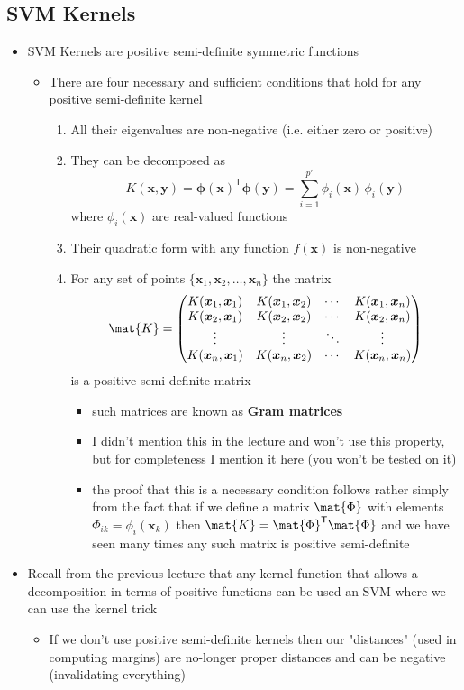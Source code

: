 \documentclass[11pt]{article}
\newcommand{\tr}{\textsf{T}}
\begin{document}
\subsection{SVM Kernels}
\label{sec:org3a7ead6}
\begin{itemize}
\item SVM Kernels are positive semi-definite symmetric functions
\begin{itemize}
\item There are four necessary and sufficient conditions that hold
for any positive semi-definite kernel
\begin{enumerate}
\item All their eigenvalues are non-negative (i.e. either zero or positive)
\item They can be decomposed as
$$  K(\bm{x},\bm{y}) = \bm{\phi}(\bm{x})^\tr\bm{\phi}(\bm{y}) =
          \sum_{i=1}^{p'} \phi_i(\bm{x})\,\phi_i(\bm{y})$$
where \(\phi_i(\bm{x})\) are real-valued functions
\item Their quadratic form with any function \(f(\bm{x})\) is non-negative
\item For any set of points \(\{\bm{x}_1, \bm{x}_2, \ldots,
          \bm{x}_n\}\) the matrix
$$ \mat{K} = \begin{pmatrix} K(\bm{x}_1, \bm{x}_1) &
          K(\bm{x}_1, \bm{x}_2) &\cdots &  K(\bm{x}_1, \bm{x}_n) \\
          K(\bm{x}_2, \bm{x}_1) &
          K(\bm{x}_2, \bm{x}_2) &\cdots &  K(\bm{x}_2, \bm{x}_n) \\
	  \vdots & \vdots & \ddots & \vdots \\
          K(\bm{x}_n, \bm{x}_1) &
          K(\bm{x}_n, \bm{x}_2) &\cdots &  K(\bm{x}_n, \bm{x}_n) 
	  \end{pmatrix} $$
is a positive semi-definite matrix
\begin{itemize}
\item such matrices are known as \textbf{Gram matrices}
\item I didn't mention this in the lecture and won't use this
property, but for completeness I mention it here (you
won't be tested on it)
\item the proof that this is a necessary condition follows
rather simply from the fact that if we define a matrix
\(\mat{\Phi}\) with elements \(\Phi_{ik} = \phi_i(\bm{x}_k)\)
then \(\mat{K} = \mat{\Phi}^\tr \mat{\Phi}\) and we have
seen many times any such matrix is positive semi-definite
\end{itemize}
\end{enumerate}
\end{itemize}
\item Recall from the previous lecture that any kernel function that
allows a decomposition in terms of positive functions can be used
an SVM where we can use the kernel trick
\begin{itemize}
\item If we don't use positive semi-definite kernels then our
"distances" (used in computing margins) are no-longer proper
distances and can be negative (invalidating everything)
\end{itemize}
\end{itemize}
\end{document}

